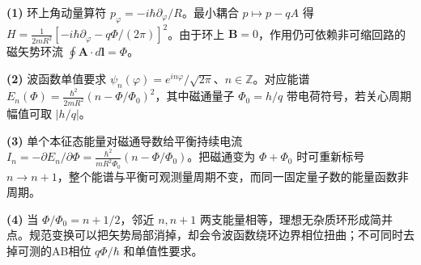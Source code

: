 \par\noindent\textbf{(1)} 环上角动量算符 \(p_\varphi=-i\hbar\partial_\varphi/R\)。最小耦合 \(p\mapsto p-qA\) 得 \(H=\frac{1}{2mR^2}[-i\hbar\partial_\varphi-q\Phi/(2\pi)]^2\)。由于环上 \(\boldsymbol B=0\)，作用仍可依赖非可缩回路的磁矢势环流 \(\oint\boldsymbol A\cdot d\boldsymbol l=\Phi\)。
\par\noindent\textbf{(2)} 波函数单值要求 \(\psi_n(\varphi)=e^{in\varphi}/\sqrt{2\pi}\)、\(n\in\mathbb Z\)。对应能谱 \(E_n(\Phi)=\frac{\hbar^2}{2mR^2}(n-\Phi/\Phi_0)^2\)，其中磁通量子 \(\Phi_0=h/q\) 带电荷符号，若关心周期幅值可取 \(|h/q|\)。
\par\noindent\textbf{(3)} 单个本征态能量对磁通导数给平衡持续电流 \(I_n=-\partial E_n/\partial\Phi=\frac{\hbar^2}{mR^2\Phi_0}(n-\Phi/\Phi_0)\)。把磁通变为 \(\Phi+\Phi_0\) 时可重新标号 \(n\to n+1\)，整个能谱与平衡可观测量周期不变，而同一固定量子数的能量函数非周期。
\par\noindent\textbf{(4)} 当 \(\Phi/\Phi_0=n+1/2\)，邻近 \(n,n+1\) 两支能量相等，理想无杂质环形成简并点。规范变换可以把矢势局部消掉，却会令波函数绕环边界相位扭曲；不可同时去掉可测的AB相位 \(q\Phi/\hbar\) 和单值性要求。
